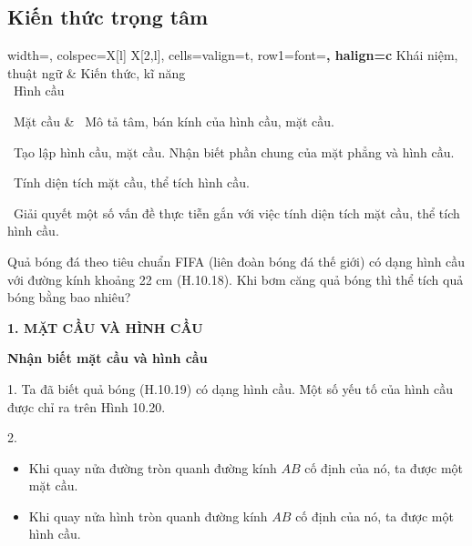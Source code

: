 \begin{lesson}
    \subsection{Kiến thức trọng tâm}

    \begin{center}
        \begin{tblr}{
            width=\linewidth,
            colspec={X[l] X[2,l]},
            cells={valign=t},
            row{1}={font=\bfseries, halign=c}
        }
            Khái niệm, thuật ngữ & Kiến thức, kĩ năng \\
            \textbullet\ Hình cầu\par
            \textbullet\ Mặt cầu
            &
            \textbullet\ Mô tả tâm, bán kính của hình cầu, mặt cầu.\par
            \textbullet\ Tạo lập hình cầu, mặt cầu. Nhận biết phần chung của mặt phẳng và hình cầu.\par
            \textbullet\ Tính diện tích mặt cầu, thể tích hình cầu.\par
            \textbullet\ Giải quyết một số vấn đề thực tiễn gắn với việc tính diện tích mặt cầu, thể tích hình cầu.
        \end{tblr}
    \end{center}

    Quả bóng đá theo tiêu chuẩn FIFA (liên đoàn bóng đá thế giới) có dạng hình cầu với đường kính khoảng 22 cm (H.10.18). Khi bơm căng quả bóng thì thể tích quả bóng bằng bao nhiêu?


    \answerline
    \answerline

    \textbf{1. MẶT CẦU VÀ HÌNH CẦU}

    \textbf{Nhận biết mặt cầu và hình cầu}

    1. Ta đã biết quả bóng (H.10.19) có dạng hình cầu. Một số yếu tố của hình cầu được chỉ ra trên Hình 10.20.


    2. \begin{itemize}
        \item Khi quay nửa đường tròn quanh đường kính $AB$ cố định của nó, ta được một mặt cầu.
        \item Khi quay nửa hình tròn quanh đường kính $AB$ cố định của nó, ta được một hình cầu.
    \end{itemize}


\end{lesson}
